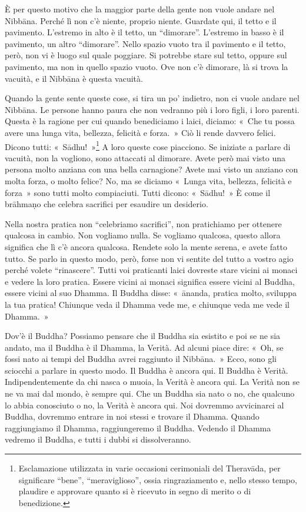 È per questo motivo che la maggior parte della gente non vuole andare
nel Nibbāna. Perché lì non c'è niente, proprio niente. Guardate
qui, il tetto e il pavimento. L'estremo in alto è il tetto, un
``dimorare''. L'estremo in basso è il pavimento, un altro ``dimorare''.
Nello spazio vuoto tra il pavimento e il tetto, però, non vi è luogo sul
quale poggiare. Si potrebbe stare sul tetto, oppure sul pavimento, ma
non in quello spazio vuoto. Ove non c'è dimorare, là si trova la
vacuità, e il Nibbāna è questa vacuità.

Quando la gente sente queste cose, si tira un po' indietro, non ci vuole
andare nel Nibbāna. Le persone hanno paura che non vedranno più i
loro figli, i loro parenti. Questa è la ragione per cui quando
benediciamo i laici, diciamo: «~Che tu possa avere una lunga vita,
bellezza, felicità e forza.~» Ciò li rende davvero felici. Dicono tutti:
«~Sādhu!~»\footnote{Esclamazione utilizzata in varie occasioni
  cerimoniali del Theravāda, per significare ``bene'', ``meraviglioso'',
  ossia ringraziamento e, nello stesso tempo, plaudire e approvare
  quanto si è ricevuto in segno di merito o di benedizione.} A loro
queste cose piacciono. Se iniziate a parlare di vacuità, non la
vogliono, sono attaccati al dimorare. Avete però mai visto una persona
molto anziana con una bella carnagione? Avete mai visto un anziano con
molta forza, o molto felice? No, ma se diciamo «~Lunga vita, bellezza,
felicità e forza~» sono tutti molto compiaciuti. Tutti dicono:
«~Sādhu!~» È come il brāhmaṇo che celebra sacrifici per esaudire un
desiderio.

Nella nostra pratica non ``celebriamo sacrifici'', non pratichiamo per
ottenere qualcosa in cambio. Non vogliamo nulla. Se vogliamo qualcosa,
questo allora significa che lì c'è ancora qualcosa. Rendete solo la
mente serena, e avete fatto tutto. Se parlo in questo modo, però, forse
non vi sentite del tutto a vostro agio perché volete ``rinascere''.
Tutti voi praticanti laici dovreste stare vicini ai monaci e vedere la
loro pratica. Essere vicini ai monaci significa essere vicini al Buddha,
essere vicini al suo Dhamma. Il Buddha disse: «~ānanda, pratica molto,
sviluppa la tua pratica! Chiunque veda il Dhamma vede me, e chiunque
veda me vede il Dhamma.~»

Dov'è il Buddha? Possiamo pensare che il Buddha sia esistito e poi se ne
sia andato, ma il Buddha è il Dhamma, la Verità. Ad alcuni piace dire:
«~Oh, se fossi nato ai tempi del Buddha avrei raggiunto il
Nibbāna.~» Ecco, sono gli sciocchi a parlare in questo
modo. Il Buddha è ancora qui. Il Buddha è Verità. Indipendentemente da
chi nasca o muoia, la Verità è ancora qui. La Verità non se ne va mai
dal mondo, è sempre qui. Che un Buddha sia nato o no, che qualcuno lo
abbia conosciuto o no, la Verità è ancora qui. Noi dovremmo avvicinarci
al Buddha, dovremmo entrare in noi stessi e trovare il Dhamma. Quando
raggiungiamo il Dhamma, raggiungeremo il Buddha. Vedendo il Dhamma
vedremo il Buddha, e tutti i dubbi si dissolveranno.

